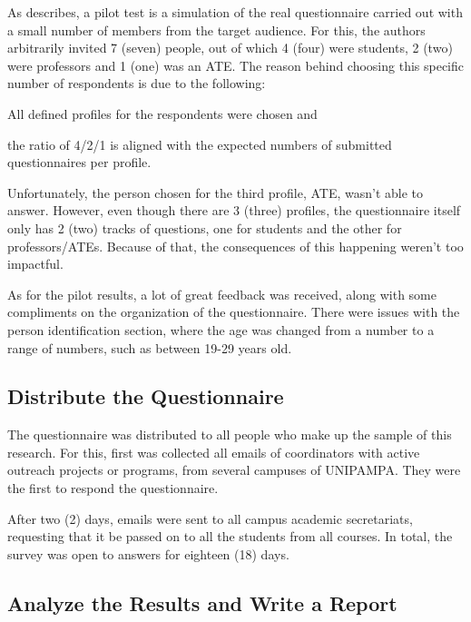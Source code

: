 As  describes, a pilot test is a simulation of the real questionnaire carried out with a small number of members from the target audience. For this, the authors arbitrarily invited 7 (seven) people, out of which 4 (four) were students, 2 (two) were professors and 1 (one) was an \ac{ATE}. The reason behind choosing this specific number of respondents is due to the following:
\begin{inparaenum}[(i)]
  \item All defined profiles for the respondents were chosen and
  \item the ratio of 4/2/1 is aligned with the expected numbers of submitted questionnaires per profile.
\end{inparaenum}

Unfortunately, the person chosen for the third profile, \ac{ATE}, wasn't able to answer. However, even though there are 3 (three) profiles, the questionnaire itself only has 2 (two) tracks of questions, one for students and the other for professors/\acp{ATE}. Because of that, the consequences of this happening weren't too impactful.

As for the pilot results, a lot of great feedback was received, along with some compliments on the organization of the questionnaire. There were issues with the person identification section, where the age was changed from a number to a range of numbers, such as between 19-29 years old.

\subsection{Distribute the Questionnaire}\label{sec:survey-distribute}

The questionnaire was distributed to all people who make up the sample of this research. For this, first was collected all emails of coordinators with active outreach projects or programs, from several campuses of \ac{UNIPAMPA}. They were the first to respond the questionnaire.

After two (2) days, emails were sent to all campus academic secretariats, requesting that it be passed on to all the students from all courses. In total, the survey was open to answers for eighteen (18) days.

\subsection{Analyze the Results and Write a Report}\label{sec:survey-analyse}


